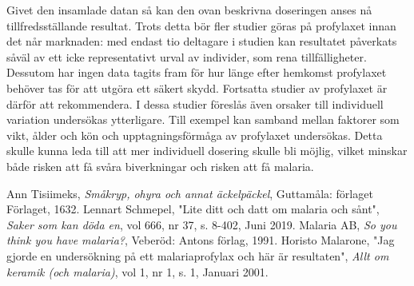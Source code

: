\documentclass[a4paper,11pt]{article}
\begin{document}
Givet den insamlade datan så kan den ovan beskrivna doseringen anses nå tillfredsställande resultat. Trots detta bör fler studier göras på profylaxet innan det når marknaden: med endast tio deltagare i studien kan resultatet påverkats såväl av ett icke representativt urval av individer, som rena tillfälligheter. Dessutom har ingen data tagits fram för hur länge efter hemkomst profylaxet behöver tas för att utgöra ett säkert skydd. Fortsatta studier av profylaxet är därför att rekommendera. I dessa studier föreslås även orsaker till individuell variation undersökas ytterligare. Till exempel kan samband mellan faktorer som vikt, ålder och kön och upptagningsförmåga av profylaxet undersökas. Detta skulle kunna leda till att mer individuell dosering skulle bli möjlig, vilket minskar både risken att få svåra biverkningar och risken att få malaria. 


\begin{thebibliography}{9}
  Ann Tisiimeks, \emph{Småkryp, ohyra och annat äckelpäckel}, Guttamåla: förlaget Förlaget, 1632.
  Lennart Schmepel, "Lite ditt och datt om malaria och sånt", \emph{Saker som kan döda en}, vol 666, nr 37, s. 8-402, Juni 2019.
  Malaria AB, \emph{So you think you have malaria?}, Veberöd: Antons förlag, 1991. 
  Horisto Malarone, "Jag gjorde en undersökning på ett malariaprofylax och här är resultaten", \emph{Allt om keramik (och malaria)}, vol 1, nr 1, s. 1, Januari 2001.
\end{thebibliography}





\end{document}
